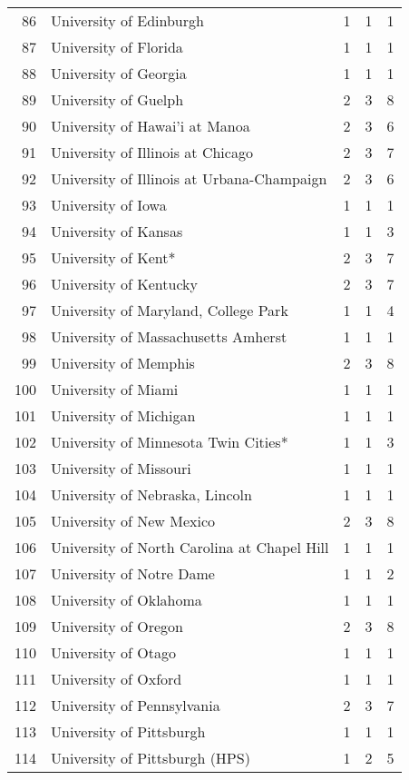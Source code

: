 \begin{table}[ht]
\begin{tabular}{rllll}
  86 & University of Edinburgh & 1 & 1 & 1 \\ 
  87 & University of Florida & 1 & 1 & 1 \\ 
  88 & University of Georgia & 1 & 1 & 1 \\ 
  89 & University of Guelph & 2 & 3 & 8 \\ 
  90 & University of Hawai'i at Manoa & 2 & 3 & 6 \\ 
  91 & University of Illinois at Chicago & 2 & 3 & 7 \\ 
  92 & University of Illinois at Urbana-Champaign & 2 & 3 & 6 \\ 
  93 & University of Iowa & 1 & 1 & 1 \\ 
  94 & University of Kansas & 1 & 1 & 3 \\ 
  95 & University of Kent* & 2 & 3 & 7 \\ 
  96 & University of Kentucky & 2 & 3 & 7 \\ 
  97 & University of Maryland, College Park & 1 & 1 & 4 \\ 
  98 & University of Massachusetts Amherst & 1 & 1 & 1 \\ 
  99 & University of Memphis & 2 & 3 & 8 \\ 
  100 & University of Miami & 1 & 1 & 1 \\ 
  101 & University of Michigan & 1 & 1 & 1 \\ 
  102 & University of Minnesota Twin Cities* & 1 & 1 & 3 \\ 
  103 & University of Missouri & 1 & 1 & 1 \\ 
  104 & University of Nebraska, Lincoln & 1 & 1 & 1 \\ 
  105 & University of New Mexico & 2 & 3 & 8 \\ 
  106 & University of North Carolina at Chapel Hill & 1 & 1 & 1 \\ 
  107 & University of Notre Dame & 1 & 1 & 2 \\ 
  108 & University of Oklahoma & 1 & 1 & 1 \\ 
  109 & University of Oregon & 2 & 3 & 8 \\ 
  110 & University of Otago & 1 & 1 & 1 \\ 
  111 & University of Oxford & 1 & 1 & 1 \\ 
  112 & University of Pennsylvania & 2 & 3 & 7 \\ 
  113 & University of Pittsburgh & 1 & 1 & 1 \\ 
  114 & University of Pittsburgh (HPS) & 1 & 2 & 5 \\ 

\end{tabular}
\end{table}

